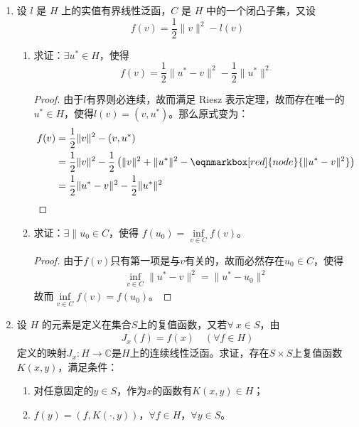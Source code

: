 \begin{enumerate}[leftmargin=2cm, label=\arabic*]
\begin{proof}
			
		\end{proof}
		\item 设 $l$ 是 $H$ 上的实值有界线性泛函，$C$ 是 $H$ 中的一个闭凸子集，又设
		\begin{equation*}
			f(v) = \frac{1}{2}\|v\|^2 - l(v)    
		\end{equation*}
		\begin{enumerate}[leftmargin=1cm, label=(\arabic*)]
			\item 求证：$\exists u^*\in H$，使得
			\begin{equation*}
				f(v) = \frac{1}{2}\|u^* - v\|^2 - \frac{1}{2}\|u^*\|^2
			\end{equation*}
			\begin{proof}
				由于$l$有界则必连续，故而满足 Riesz 表示定理，故而存在唯一的$u^*\in H$，使得$l(v) = (v, u^*)$。那么原式变为：
				\begin{align*}
					f(v) &= \frac{1}{2}\|v\|^2 - (v, u^*) \\
					& = \frac{1}{2}\|v\|^2 - \frac{1}{2}\left(\|v\|^2 + \|u^*\|^2 - \eqnmarkbox[red]{node}{\|u^*-v\|^2}\right) \\
					& = \frac{1}{2}\|u^* - v\|^2 - \frac{1}{2}\|u^*\|^2 
				\end{align*}
			\end{proof}
			\item 求证：$\exists\| u_0\in C$，使得 $f(u_0) = \inf\limits_{v\in C} f(v)$。
			\begin{proof}
				由于$f(v)$只有第一项是与$v$有关的，故而必然存在$u_0\in C$，使得
				\begin{align*}
					\inf\limits_{v\in C}\|u^*-v\|^2 = \|u^* - u_0\|^2 
				\end{align*}
				故而$\inf\limits_{v\in C}f(v) = f(u_0)$。
			\end{proof}
		\end{enumerate}
		\item 设 $H$ 的元素是定义在集合$S$上的复值函数，又若$\forall\ x\in S$，由
		\begin{align*}
			J_x(f) = f(x)\quad (\forall f\in H)
		\end{align*}
		定义的映射$J_x:H\to\mathbb{C}$是$H$上的连续线性泛函。求证，存在$S\times S$上复值函数$K(x,y)$，满足条件：
		\begin{enumerate}[leftmargin=1cm, label=(\arabic*)]
			\item 对任意固定的$y\in S$，作为$x$的函数有$K(x,y)\in H$；
			\item $f(y) = (f, K(\cdot,y))$，$\forall f\in H$，$\forall y\in S$。

\end{enumerate}
\end{enumerate}
